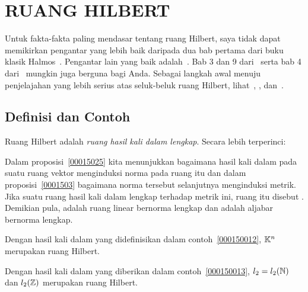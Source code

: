 \chapter{RUANG HILBERT}

Untuk fakta-fakta paling mendasar tentang ruang Hilbert, saya tidak dapat memikirkan pengantar yang lebih baik daripada dua bab pertama
dari buku klasik Halmos~\cite{Halmos:1951}.  Pengantar lain yang baik adalah~\cite{Young:1988}.  Bab 3 dan 9 dari~\cite{Kreyszig:1978}
serta bab 4 dari~\cite{Ha:2006} mungkin juga berguna bagi Anda.  Sebagai langkah awal menuju penjelajahan yang lebih serius
atas seluk-beluk ruang Hilbert, lihat~\cite{Conway:1990}, \cite{Conway:2000}, dan~\cite{Helmberg:1969}.


\section{Definisi dan Contoh}

Ruang Hilbert adalah \emph{ruang hasil kali dalam lengkap}.  Secara lebih terperinci:
\begin{defn} Dalam proposisi~\ref{00015025} kita menunjukkan bagaimana hasil kali dalam pada suatu ruang vektor menginduksi norma pada ruang itu dan dalam
proposisi~\ref{0001503} bagaimana norma tersebut selanjutnya menginduksi metrik.  Jika suatu ruang hasil kali dalam lengkap terhadap metrik ini,
ruang itu disebut
.  Demikian pula,
 adalah ruang linear bernorma lengkap dan
 adalah aljabar bernorma lengkap.
\end{defn}

\begin{exam} Dengan hasil kali dalam yang didefinisikan dalam
contoh~\ref{000150012}, $\mathbb{K}^n$ merupakan ruang Hilbert.
\end{exam}

\begin{exam}\label{exam150013} Dengan hasil kali dalam yang diberikan dalam
contoh~\ref{000150013}, $l_2 = l_2(\mathbb{N})$ dan $l_2(\mathbb{Z})$ merupakan ruang Hilbert.
\end{exam}

